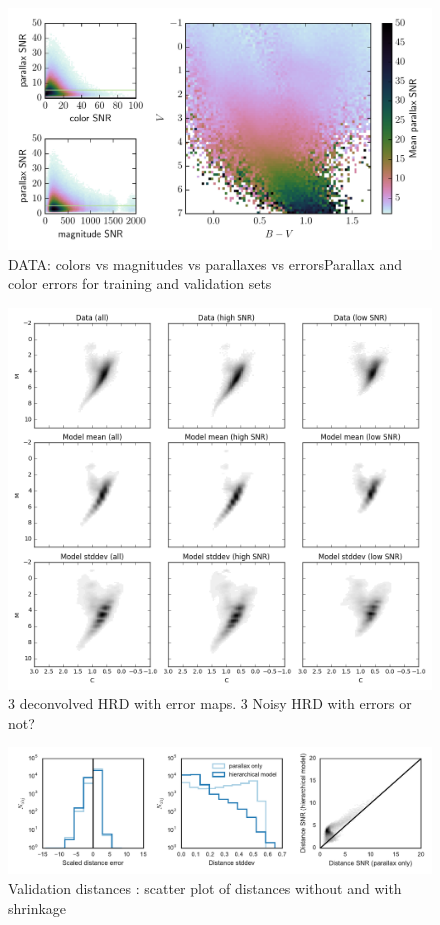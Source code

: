 \documentclass[aps,prd,showpacs,superscriptaddress,groupedaddress]{revtex4}  %
\begin{document}
\begin{figure}
\includegraphics[width=17cm]{datasummary.pdf}
\caption{DATA: colors vs magnitudes vs parallaxes vs errorsParallax and color errors for training and validation sets}
\end{figure}

\begin{figure}
\includegraphics[width=17cm]{colmagdiag_threemeanstd.png}
\caption{3 deconvolved HRD with error maps. 3 Noisy HRD with errors or not? }
\end{figure}

\begin{figure}
\includegraphics[width=17cm]{metrics.pdf}
\caption{Validation distances : scatter plot of distances without and with shrinkage}
\end{figure}
\end{document}
